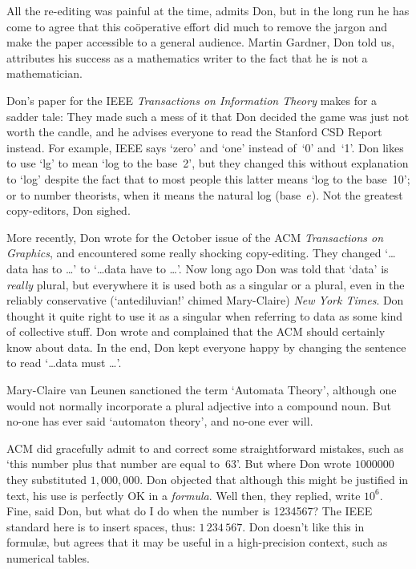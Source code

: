 All the re-editing was painful at the time, admits Don, but in the
long run he has come to agree that this co\"operative 
 effort did much to remove the jargon and
make the paper accessible to a general audience. Martin Gardner, Don
told us, attributes his success as a mathematics writer to the fact
that he is not a mathematician.

Don's paper for the 
IEEE  {\sl Transactions on Information Theory\/}
makes for a sadder tale: They made
such a mess of it that Don decided the game was just not worth the candle,
and he advises everyone to read the Stanford CSD Report instead.  For
example, IEEE says `zero' and `one' instead of~`0' and~`1'. 
Don likes to use `lg' to mean `log to the base~2', but
they changed this without explanation to `log' despite the fact that
to most people this latter means `log to the base~10'; or to number
theorists, when it means the natural log (base~$e$). Not the greatest copy-editors,
Don sighed.

More recently, Don wrote for the October issue of the ACM {\sl Transactions on
Graphics}, and encountered some really shocking copy-editing. They changed
`\dots  data has to \dots' to `\dots data have to \dots'. Now long ago Don was
told that `data' is {\it really\/} plural, but everywhere it is used
both as a singular or a plural, even in the reliably conservative
(`antediluvian!' chimed Mary-Claire) {\sl New York Times}.
Don thought it quite right to use it as a singular when 
referring to data as some kind of collective stuff. Don wrote and
complained that the ACM should certainly know about data. In the end,
Don kept everyone happy by changing the sentence to read
`\dots data must \dots'.

Mary-Claire van Leunen sanctioned the term `Automata Theory',
although one would not normally incorporate a plural adjective into a
compound noun. But no-one has ever said `automaton theory', and no-one
ever will.  

ACM did gracefully admit to and correct some
straightforward mistakes, such as `this number plus that number are
equal to~63'. But where Don wrote $1000000$ they substituted
$1{,}000{,}000$. Don objected that although this might be justified in
text, his use is perfectly OK in a {\it formula}. Well then, they
replied, write $10^6$. Fine, said Don, but what do I do
when the number is 1234567? The IEEE standard here is to insert
spaces, thus: $1\,234\,567$. Don doesn't like this in formul\ae, but agrees
that it may be useful in a high-precision context, such as numerical
tables.


